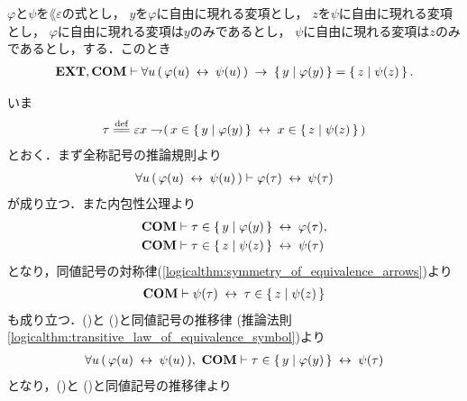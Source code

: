 	\begin{screen}
		\begin{thm}
		\label{thm:equivalent_formula_rewriting_6}
			$\varphi$と$\psi$を$\lang{\varepsilon}$の式とし，
			$y$を$\varphi$に自由に現れる変項とし，
			$z$を$\psi$に自由に現れる変項とし，
			$\varphi$に自由に現れる変項は$y$のみであるとし，
			$\psi$に自由に現れる変項は$z$のみであるとし，する．このとき
			\begin{align}
				\mbox{{\bf EXT}},\mbox{\bf COM} \vdash \forall u\, (\, \varphi(u) \hspace{0.25em}\leftrightarrow\hspace{0.25em} \psi(u)\, )
				\hspace{0.25em}\rightarrow\hspace{0.25em} \left\{\, y \mid \varphi(y)\, \right\} = \left\{\, z \mid \psi(z)\, \right\}.
			\end{align}
		\end{thm}
	\end{screen}
	
	\begin{sketch}
		いま
		\begin{align}
			\tau \defeq \varepsilon x \negation (\, x \in \Set{y}{\varphi(y)} \lrarrow x \in \Set{z}{\psi(z)}\, )
		\end{align}
		とおく．まず全称記号の推論規則より
		\begin{align}
			\forall u\, (\, \varphi(u) \hspace{0.25em}\leftrightarrow\hspace{0.25em} \psi(u)\, )
			\vdash \varphi(\tau) \hspace{0.25em}\leftrightarrow\hspace{0.25em} \psi(\tau)
			\label{fom:equivalent_formula_rewriting_6_1}
		\end{align}
		が成り立つ．また内包性公理より
		\begin{align}
			\mbox{\bf COM} &\vdash \tau \in \left\{\, y \mid \varphi(y)\, \right\} \hspace{0.25em}\leftrightarrow\hspace{0.25em} \varphi(\tau), 
			\label{fom:equivalent_formula_rewriting_6_2} \\
			\mbox{\bf COM} &\vdash \tau \in \left\{\, z \mid \psi(z)\, \right\} \hspace{0.25em}\leftrightarrow\hspace{0.25em} \psi(\tau)
		\end{align}
		となり，同値記号の対称律(\ref{logicalthm:symmetry_of_equivalence_arrows})より
		\begin{align}
			\mbox{\bf COM} \vdash \psi(\tau) \hspace{0.25em}\leftrightarrow\hspace{0.25em} \tau \in \left\{\, z \mid \psi(z)\, \right\}
			\label{fom:equivalent_formula_rewriting_6_3}
		\end{align}
		も成り立つ．()と
		()と同値記号の推移律
		(推論法則\ref{logicalthm:transitive_law_of_equivalence_symbol})より
		\begin{align}
			\forall u\, (\, \varphi(u) \hspace{0.25em}\leftrightarrow\hspace{0.25em} \psi(u)\, ),\ \mbox{\bf COM} \vdash
			\tau \in \left\{\, y \mid \varphi(y)\, \right\} \hspace{0.25em}\leftrightarrow\hspace{0.25em} \psi(\tau)
			\label{fom:equivalent_formula_rewriting_6_4}
		\end{align}
		となり，()と
		()と同値記号の推移律より

\end{sketch}
